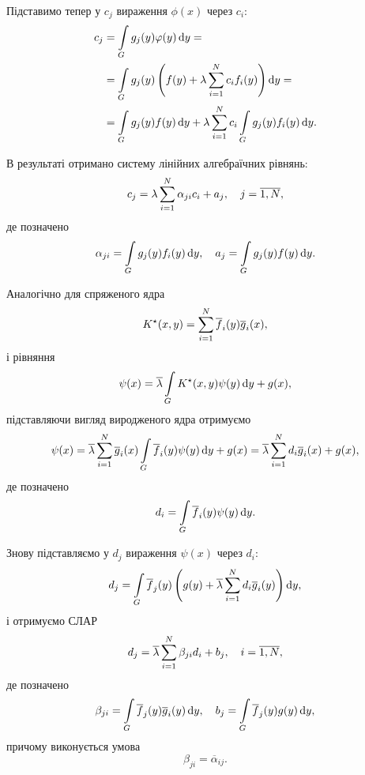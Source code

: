Підставимо тепер у $c_j$ вираження $\phi(x)$ через $c_i$:
\begin{equation}
	\begin{aligned}
		c_j &= \displaystyle\int\limits_G g_j(y) \varphi(y) \mathop{}\!\mathrm{d} y = \\
		&= \displaystyle\int\limits_G g_j(y) \left( f(y) + \lambda \displaystyle\sum\limits_{i = 1}^N c_i f_i(y) \right) \mathop{}\!\mathrm{d} y = \\
		&= \displaystyle\int\limits_G g_j(y) f(y) \mathop{}\!\mathrm{d} y + \lambda \displaystyle\sum\limits_{i = 1}^N c_i \displaystyle\int\limits_G g_j(y) f_i(y) \mathop{}\!\mathrm{d} y.
	\end{aligned}
\end{equation}

В результаті отримано систему лінійних алгебраїчних рівнянь:
\begin{equation}
	c_j = \lambda \displaystyle\sum\limits_{i = 1}^N \alpha_{j i} c_i + a_j, \quad j = \overline{1, N},
\end{equation}
де позначено
\begin{equation}
	\alpha_{ji} = \displaystyle\int\limits_G g_j(y) f_i(y) \mathop{}\!\mathrm{d} y, \quad a_j = \displaystyle\int\limits_G g_j(y) f(y) \mathop{}\!\mathrm{d} y.
\end{equation}

Аналогічно для спряженого ядра
\begin{equation}
	K^\star (x, y) = \displaystyle\sum\limits_{i = 1}^N \overline f_i(y) \overline g_i(x),
\end{equation}
і рівняння
\begin{equation}
	\psi(x) = \overline \lambda \displaystyle\int\limits_G K^\star (x, y) \psi(y) \mathop{}\!\mathrm{d} y + g(x),
\end{equation}
підставляючи вигляд виродженого ядра отримуємо
\begin{equation}
	\psi(x) = \overline \lambda \displaystyle\sum\limits_{i = 1}^N \overline g_i(x) \displaystyle\int\limits_G \overline f_i(y) \psi(y) \mathop{}\!\mathrm{d} y + g(x) = \overline \lambda \displaystyle\sum\limits_{i = 1}^N d_i \overline g_i(x) + g(x),
\end{equation}
де позначено
\begin{equation}
	d_i = \displaystyle\int\limits_G \overline f_i(y) \psi(y) \mathop{}\!\mathrm{d} y.
\end{equation}

Знову підставляємо у $d_j$ вираження $\psi(x)$ через $d_i$:
\begin{equation}
	d_j = \displaystyle\int\limits_G \overline f_j(y) \left( g(y) + \overline \lambda \displaystyle\sum\limits_{i = 1}^N d_i \overline g_i(y) \right) \mathop{}\!\mathrm{d} y,
\end{equation}
і отримуємо СЛАР
\begin{equation}
	d_j = \overline \lambda \displaystyle\sum\limits_{i = 1}^N \beta_{ji}d_i + b_j, \quad i = \overline{1, N}, 
\end{equation}
де позначено
\begin{equation} 
	\beta_{ji} = \displaystyle\int\limits_G \overline f_j(y) \overline g_i(y) \mathop{}\!\mathrm{d} y, \quad b_j = \displaystyle\int\limits_G \overline f_j(y) g(y) \mathop{}\!\mathrm{d} y,
\end{equation}
причому виконується умова
\begin{equation}
	\beta_{ji} = \overline \alpha_{ij}.
\end{equation}

